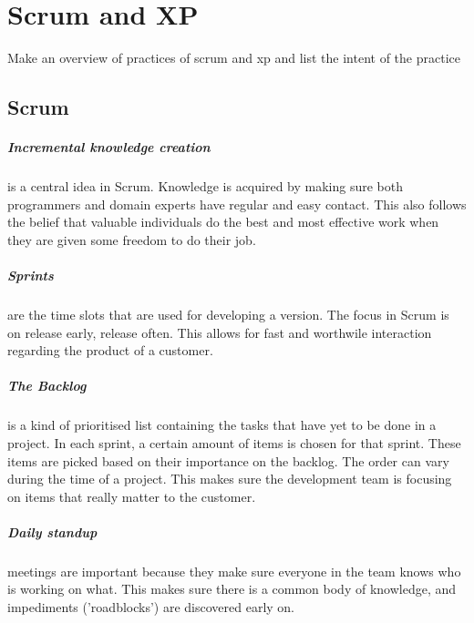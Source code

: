 \documentclass[]{uva-bachelor-thesis}
\title{\course}
\subtitle{\assignment}
\author{\group}
\begin{document}
\maketitle

\setlength{\parskip}{0px}
\tableofcontents
\setlength{\parskip}{.5em}

\clearpage


\chapter{Scrum and XP}
Make an overview of practices of scrum and xp and list the intent of the practice

\section{Scrum}
\paragraph{Incremental knowledge creation} is a central idea in Scrum. 
Knowledge is acquired by making sure both programmers and domain experts have regular and easy contact.
This also follows the belief that valuable individuals do the best and most effective work when they are given some freedom to do their job.

\paragraph{Sprints} are the time slots that are used for developing a version. 
The focus in Scrum is on release early, release often. 
This allows for fast and worthwile interaction regarding the product of a customer.

\paragraph{The Backlog} is a kind of prioritised list containing the tasks that have yet to be done in a project. 
In each sprint, a certain amount of items is chosen for that sprint. 
These items are picked based on their importance on the backlog. 
The order can vary during the time of a project. 
This makes sure the development team is focusing on items that really matter to the customer.

\paragraph{Daily standup} meetings are important because they make sure everyone in the team knows who is working on what. 
This makes sure there is a common body of knowledge, and impediments ('roadblocks') are discovered early on. 
\end{document}
